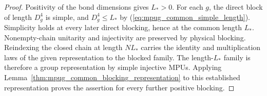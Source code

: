 \begin{proof}\leanok
    Positivity of the bond dimensions gives $L_*>0$. For each $g$, the direct
    block of length $D_g^4$ is simple, and $D_g^4\leq L_*$ by
    (\ref{eq:mpug_common_simple_length}). Simplicity holds at every later direct
    blocking, hence at the common length $L_*$. Nonempty-chain unitarity and
    injectivity are preserved by physical blocking. Reindexing the closed chain
    at length $NL_*$ carries the identity and multiplication laws of the given
    representation to the blocked family. The length-$L_*$ family is therefore
    a group representation by simple injective MPUs. Applying
    Lemma~\ref{thm:mpug_common_blocking_representation} to this established
    representation proves the assertion for every further positive blocking.
\end{proof}

